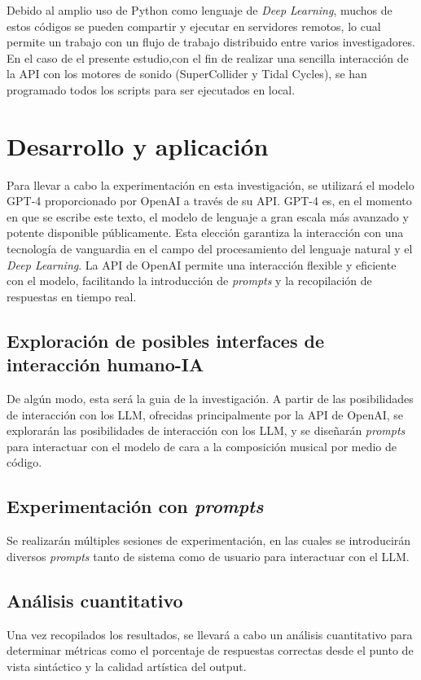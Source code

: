     Debido al amplio uso de Python como lenguaje de \textit{Deep Learning}, muchos de estos códigos se pueden compartir y ejecutar en servidores remotos, lo cual permite un trabajo con un flujo de trabajo distribuido entre varios investigadores. En el caso de el presente estudio,con el fin de realizar una sencilla interacción de la API con los motores de sonido (SuperCollider y Tidal Cycles), se han programado todos los scripts para ser ejecutados en local.


\section{Desarrollo y aplicación}

Para llevar a cabo la experimentación en esta investigación, se utilizará el modelo GPT-4 proporcionado por OpenAI a través de su API. GPT-4 es, en el momento en que se escribe este texto, el modelo de lenguaje a gran escala más avanzado y potente disponible públicamente. Esta elección garantiza la interacción con una tecnología de vanguardia en el campo del procesamiento del lenguaje natural y el \textit{Deep Learning}. La API de OpenAI permite una interacción flexible y eficiente con el modelo, facilitando la introducción de \textit{prompts} y la recopilación de respuestas en tiempo real.

\subsection{Exploración de posibles interfaces de interacción humano-IA}
De algún modo, esta será la guia de la investigación. A partir de las posibilidades de interacción con los LLM, ofrecidas principalmente por la API de OpenAI, se explorarán las posibilidades de interacción con los LLM, y se diseñarán \textit{prompts} para interactuar con el modelo de cara a la composición musical por medio de código.


\subsection{Experimentación con \textit{prompts}}
Se realizarán múltiples sesiones de experimentación, en las cuales se introducirán diversos \textit{prompts} tanto de sistema como de usuario para interactuar con el LLM.

\subsection{Análisis cuantitativo}
Una vez recopilados los resultados, se llevará a cabo un análisis cuantitativo para determinar métricas como el porcentaje de respuestas correctas desde el punto de vista sintáctico y la calidad artística del output.

